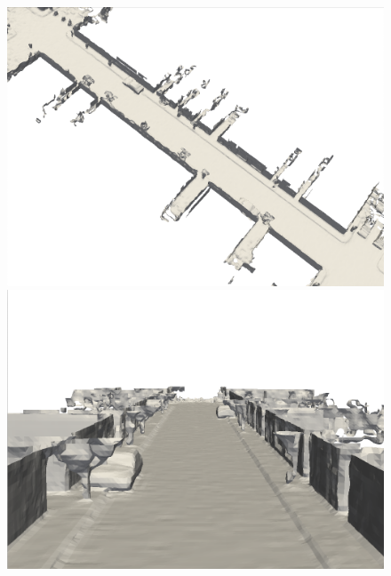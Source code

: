 \begin{figure}[htbp]
    \centering
    \begin{minipage}{0.5\linewidth}
    \centering
    \includegraphics[width=1\linewidth]{figures/mai_3_shine.png}
    \end{minipage}\hfill
    \begin{minipage}{0.5\linewidth}
    \centering
    \includegraphics[width=1\linewidth]{figures/mai_1_shine.png}
    \end{minipage}
    \vfill
    \begin{minipage}{0.5\linewidth}
    \centering

\end{minipage}
\end{figure}

